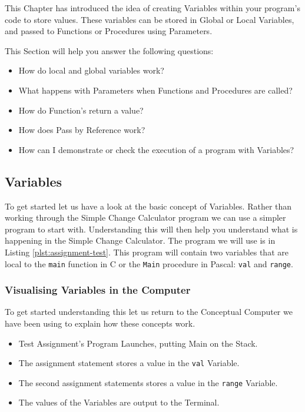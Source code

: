 This Chapter has introduced the idea of creating Variables within your program's code to store values. These variables can be stored in Global or Local Variables, and passed to Functions or Procedures using Parameters.

This Section will help you answer the following questions:
\begin{itemize}
  \item How do local and global variables work?
  \item What happens with Parameters when Functions and Procedures are called?
  \item How do Function's return a value?
  \item How does Pass by Reference work?
  \item How can I demonstrate or check the execution of a program with Variables?
\end{itemize}

\subsection{Variables} %
\label{sub:visualise_variables}

To get started let us have a look at the basic concept of Variables. Rather than working through the Simple Change Calculator program we can use a simpler program to start with. Understanding this will then help you understand what is happening in the Simple Change Calculator. The program we will use is in Listing \ref{plst:assignment-test}. This program will contain two variables that are local to the \texttt{main} function in C or the \texttt{Main} procedure in Pascal: \texttt{val} and \texttt{range}.



\subsubsection{Visualising Variables in the Computer} %
\label{ssub:visualising_variables_in_the_computer}

To get started understanding this let us return to the Conceptual Computer we have been using to explain how these concepts work.

\begin{itemize}
  \item Test Assignment's Program Launches, putting Main on the Stack.
  \item The assignment statement stores a value in the \texttt{val} Variable.
  \item The second assignment statements stores a value in the \texttt{range} Variable.
  \item The values of the Variables are output to the Terminal.
\end{itemize}

